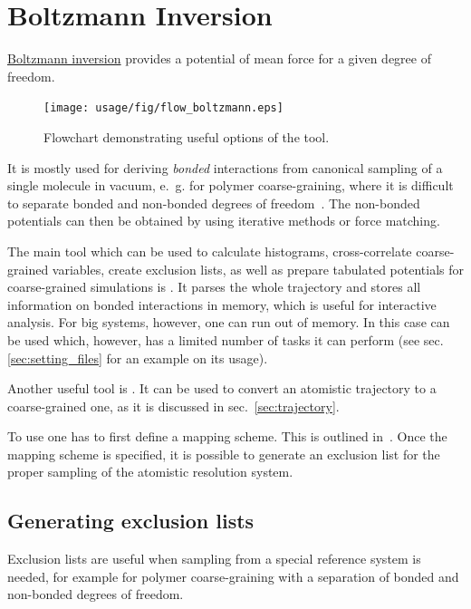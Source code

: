 \chapter{Boltzmann Inversion}

\hyperref[sec:bi]{Boltzmann inversion} provides a potential of mean force for a given degree of freedom. 
%
\begin{figure}
   \centering
   \texttt{[image: usage/fig/flow\_boltzmann.eps]}
   \caption{Flowchart demonstrating useful options of the tool.}
\end{figure}
%
It is mostly used for deriving {\em bonded} interactions from canonical sampling of a single molecule in vacuum, e.~g. for polymer coarse-graining, where it is difficult to separate bonded and non-bonded degrees of freedom~\cite{Tschoep:1998}. The non-bonded potentials can then be obtained by using iterative methods or force matching.

The main tool which can be used to calculate histograms, cross-correlate coarse-grained variables, create exclusion lists, as well as prepare tabulated potentials for coarse-grained simulations is . It parses the whole trajectory and stores all information on bonded interactions in memory, which is useful for interactive analysis. For big systems, however, one can run out of memory. In this case  can be used which, however, has a limited number of tasks it can perform (see sec. \ref{sec:setting_files} for an example on its usage).

Another useful tool is . It can be used to convert an atomistic trajectory to a coarse-grained one, as it is discussed in sec.~\ref{sec:trajectory}.

To use  one has to first define a mapping scheme. This is outlined in~. Once the mapping scheme is specified, it is possible to generate an exclusion list for the proper sampling of the atomistic resolution system.

\section{Generating exclusion lists}
\label{sec:exclusions}
Exclusion lists are useful when sampling from a special reference system is needed, for example for polymer coarse-graining with a separation of bonded and non-bonded degrees of freedom.

